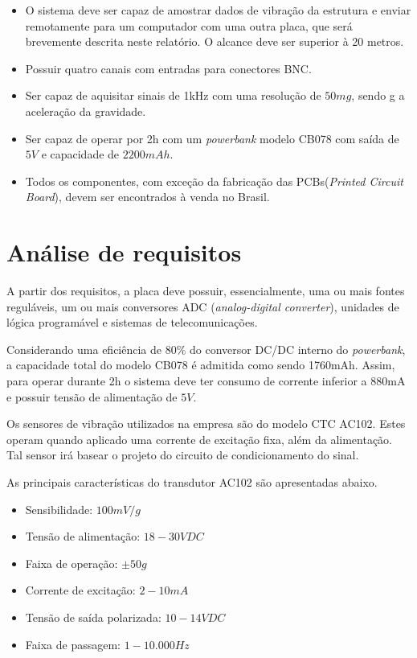 \documentclass[
	12pt,				%
	openright,			%
	twoside,			%
	a4paper,			%
	english,			%
	french,				%
	spanish,			%
	brazil,				%
	]{abntex2}
\begin{document}
		\begin{itemize}
			\item O sistema deve ser capaz de amostrar dados de vibração da
			estrutura e enviar remotamente para um computador com uma outra
			placa, que será brevemente descrita neste relatório. O alcance
			deve ser superior à 20 metros.
			
			\item Possuir quatro canais com entradas para conectores BNC.
			
			\item Ser capaz de aquisitar sinais de 1kHz com uma resolução de $50mg$, sendo g
			a aceleração da gravidade.
			
			\item Ser capaz de operar por 2h com um \textit{powerbank} modelo CB078 com saída de $5V$
			e capacidade de $2200mAh$.
			
			\item Todos os componentes, com exceção da fabricação das
			PCBs(\textit{Printed Circuit Board}), devem ser encontrados à
			venda no Brasil.
		\end{itemize}

	\section{Análise de requisitos}
	
		A partir dos requisitos, a placa deve possuir, essencialmente, uma
		ou mais fontes reguláveis, um ou mais conversores ADC
		(\textit{analog-digital converter}), unidades de lógica programável
		e sistemas de telecomunicações.

		Considerando uma eficiência de $80\%$ do conversor DC/DC interno do
		\textit{powerbank}, a capacidade total do modelo CB078 é admitida como sendo
		1760mAh. Assim, para operar durante 2h o sistema deve ter consumo de
		corrente inferior a 880mA e possuir tensão de alimentação de $5V$.
		
		Os sensores de vibração utilizados na empresa são do modelo CTC
		AC102. Estes operam quando aplicado uma corrente de excitação fixa,
		além da alimentação. Tal sensor irá basear o projeto do circuito de
		condicionamento do sinal.
		
		As principais características do transdutor AC102 são apresentadas
		abaixo.\cite{ctc}
		
		\begin{itemize}
			\item Sensibilidade: $100mV/g$
			\item Tensão de alimentação: $18 - 30 VDC$
			\item Faixa de operação: $\pm 50g$
			\item Corrente de excitação: $2 - 10mA$
			\item Tensão de saída polarizada: $10 - 14 VDC$
			\item Faixa de passagem: $1 - 10.000 Hz$
		\end{itemize}
		
\end{document}
